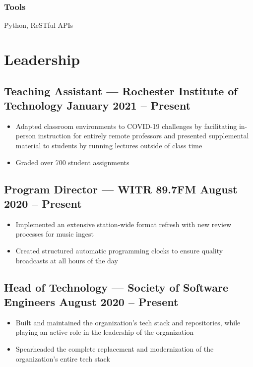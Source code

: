 \documentclass[11pt, letterpaper]{article}
\begin{document}
            \subsubsection{Tools}
                Python, ReSTful APIs

    \section{Leadership}
        \subsection{Teaching Assistant --- Rochester Institute of Technology \hfill January 2021 -- Present}
            \begin{itemize}[nosep]
                \item Adapted classroom environments to COVID-19 challenges by facilitating in-person
                    instruction for entirely remote professors and presented supplemental material to 
                    students by running lectures outside of class time
                \item Graded over 700 student assignments
            \end{itemize}

        \subsection{Program Director --- WITR 89.7FM \hfill August 2020 -- Present}
            \begin{itemize}[nosep]
                \item Implemented an extensive station-wide format refresh with new review processes for music ingest
                \item Created structured automatic programming clocks to ensure quality broadcasts at all 
                    hours of the day
            \end{itemize}

        \subsection{Head of Technology --- Society of Software Engineers \hfill August 2020 -- Present}
            \begin{itemize}[nosep]
                \item Built and maintained the organization's tech stack and repositories, while playing an active 
                    role in the \newline leadership of the organization 
                \item Spearheaded the complete replacement and modernization of the organization's entire tech 
                    stack
            \end{itemize}
\end{document}
